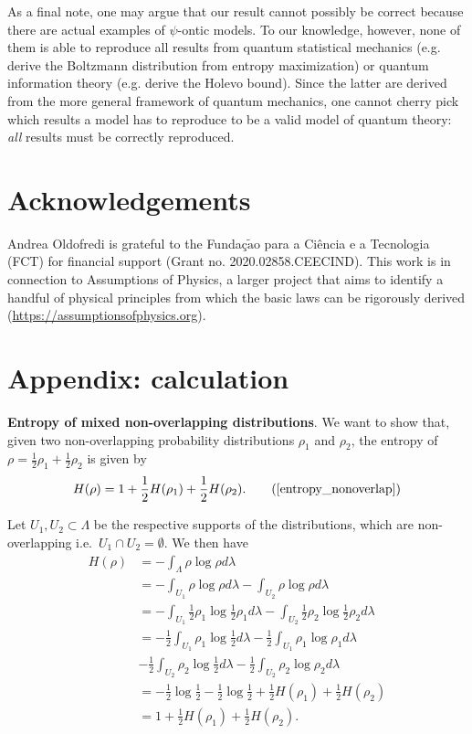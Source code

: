 \documentclass[10pt,twocolumn, nofootinbib]{revtex4-2}
\begin{document}
As a final note, one may argue that our result cannot possibly be correct because there are actual examples of $\psi$-ontic models. To our knowledge, however, none of them is able to reproduce all results from quantum statistical mechanics (e.g. derive the Boltzmann distribution from entropy maximization) or quantum information theory (e.g. derive the Holevo bound). Since the latter are derived from the more general framework of quantum mechanics, one cannot cherry pick which results a model has to reproduce to be a valid model of quantum theory: \emph{all} results must be correctly reproduced.

\section{Acknowledgements}

Andrea Oldofredi is grateful to the Funda\c{c}$\tilde{\mathrm{a}}$o para a Ci\^encia e a Tecnologia (FCT) for financial support (Grant no. 2020.02858.CEECIND).  This work is in connection to Assumptions of Physics, a larger project that aims to identify a handful of physical principles from which the basic laws can be rigorously derived  (\url{https://assumptionsofphysics.org}).

%

\clearpage

\section*{Appendix: calculation}
\label{A}
\textbf{Entropy of mixed non-overlapping distributions}. We want to show that, given two non-overlapping probability distributions $\rho_1$ and $\rho_2$, the entropy of $\rho = \frac{1}{2} \rho_1 + \frac{1}{2} \rho_2$ is given by
\begin{equation}
	H(\rho) = 1 + \frac{1}{2} H(\rho_1) + \frac{1}{2} H(\rho_2). \tag{\ref{entropy_nonoverlap}}
\end{equation}

Let $U_1, U_2 \subset \Lambda$ be the respective supports of the distributions, which are non-overlapping i.e.\ $U_1 \cap U_2 = \emptyset$. We then have
\begin{align*}
	H(\rho) &= - \int_\Lambda \rho \log \rho d\lambda \\
	&= -\int_{U_1} \rho \log \rho d\lambda -\int_{U_2} \rho \log \rho d\lambda \\
	&= -\int_{U_1} \frac{1}{2} \rho_1 \log \frac{1}{2} \rho_1 d\lambda -\int_{U_2} \frac{1}{2} \rho_2 \log \frac{1}{2} \rho_2 d\lambda \\
	&= - \frac{1}{2} \int_{U_1} \rho_1 \log \frac{1}{2} d\lambda - \frac{1}{2} \int_{U_1} \rho_1 \log \rho_1 d\lambda \\
	&- \frac{1}{2} \int_{U_2} \rho_2 \log \frac{1}{2} d\lambda - \frac{1}{2} \int_{U_2} \rho_2 \log \rho_2 d\lambda \\
	&= - \frac{1}{2} \log \frac{1}{2} - \frac{1}{2} \log \frac{1}{2} + \frac{1}{2} H(\rho_1) + \frac{1}{2} H(\rho_2) \\
	&= 1 + \frac{1}{2} H(\rho_1) + \frac{1}{2} H(\rho_2). \\
\end{align*}
\end{document}
